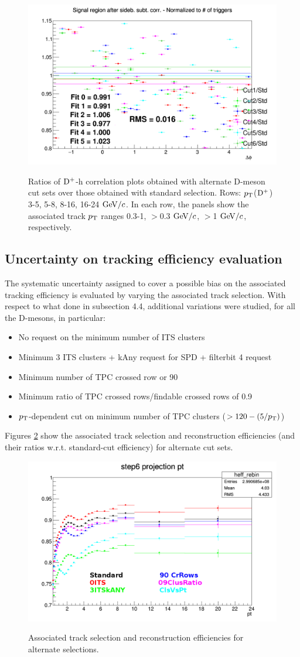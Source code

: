 \begin{figure}
{\includegraphics[width=0.31\linewidth]{figures/Systematics/Dplus/CutVar/Ratio_AzimCorrDistr_Dplus_Canvas_PtIntBins13to13_PoolInt_thr1dotto99dot.png}}
 \caption{Ratios of ${\rm D^+}$-h correlation plots obtained with alternate D-meson cut sets over those obtained with standard selection. Rows: $p_{\rm T}$(${\rm D^+}$) 3-5, 5-8, 8-16, 16-24 $\mathrm{GeV}/c$. In each row, the panels show the associated track $p_{\rm T}$ ranges 0.3-1, $>$0.3 $\mathrm{GeV}/c$,  $>$1 $\mathrm{GeV}/c$, respectively.}
\label{fig:Syst_DplusCutVar}
\end{figure}

\clearpage
\subsection{Uncertainty on tracking efficiency evaluation}
The systematic uncertainty assigned to cover a possible bias on the associated tracking efficiency is evaluated by varying the associated track selection.
With respect to what done in subsection 4.4, additional variations were studied, for all the D-mesons, in particular:
\begin{itemize}
  \item No request on the minimum number of ITS clusters
  \item Minimum 3 ITS clusters + kAny request for SPD + filterbit 4 request
  \item Minimum number of TPC crossed row or 90
  \item Minimum ratio of TPC crossed rows/findable crossed rows of 0.9
  \item $p_{\rm T}$-dependent cut on minimum number of TPC clusters ($> 120-(5/p_{\rm T})$)
\end{itemize}

Figures \ref{fig:TrEffVariations} show the associated track selection and reconstruction efficiencies (and their ratios w.r.t. standard-cut efficiency) for alternate cut sets.

\begin{figure}
\centering
{\includegraphics[width=0.75\linewidth]{figures/Systematics/Dzero/TrackCut/AltTrackEff.png}}
\caption{Associated track selection and reconstruction efficiencies for alternate selections.}
\label{fig:TrEffVariations}
\end{figure}

